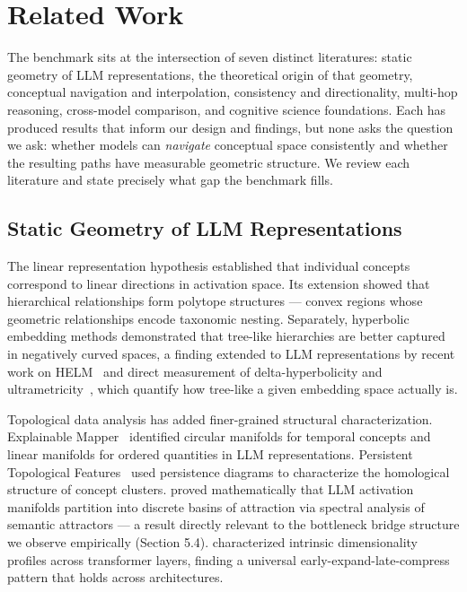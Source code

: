 \section{Related Work}\label{related-work}

The benchmark sits at the intersection of seven distinct literatures: static geometry of LLM representations, the theoretical origin of that geometry, conceptual navigation and interpolation, consistency and directionality, multi-hop reasoning, cross-model comparison, and cognitive science foundations. Each has produced results that inform our design and findings, but none asks the question we ask: whether models can \emph{navigate} conceptual space consistently and whether the resulting paths have measurable geometric structure. We review each literature and state precisely what gap the benchmark fills.

\subsection{Static Geometry of LLM Representations}\label{static-geometry-of-llm-representations}

The linear representation hypothesis \citep{park2024linear} established that individual concepts correspond to linear directions in activation space. Its extension \citep{park2025geometry} showed that hierarchical relationships form polytope structures --- convex regions whose geometric relationships encode taxonomic nesting. Separately, hyperbolic embedding methods \citep{nickel2017poincare} demonstrated that tree-like hierarchies are better captured in negatively curved spaces, a finding extended to LLM representations by recent work on HELM~\citep{helm2025} and direct measurement of delta-hyperbolicity and ultrametricity~\citep{deltahyperbolicity2025}, which quantify how tree-like a given embedding space actually is.

Topological data analysis has added finer-grained structural characterization. Explainable Mapper~\citep{explainablemapper2025} identified circular manifolds for temporal concepts and linear manifolds for ordered quantities in LLM representations. Persistent Topological Features~\citep{persistenttopological2025} used persistence diagrams to characterize the homological structure of concept clusters. \citet{wyss2025spectral} proved mathematically that LLM activation manifolds partition into discrete basins of attraction via spectral analysis of semantic attractors --- a result directly relevant to the bottleneck bridge structure we observe empirically (Section 5.4). \citet{joshi2025dimensionality} characterized intrinsic dimensionality profiles across transformer layers, finding a universal early-expand-late-compress pattern that holds across architectures.


